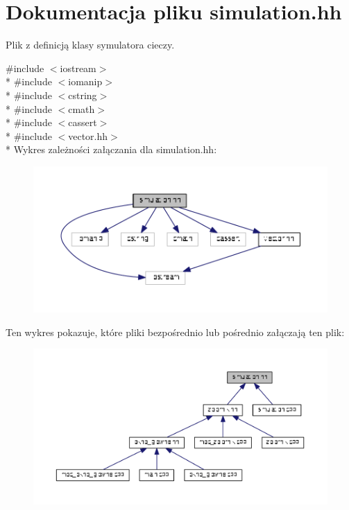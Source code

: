 \hypertarget{simulation_8hh}{}\section{Dokumentacja pliku simulation.\+hh}
\label{simulation_8hh}


Plik z definicją klasy symulatora cieczy.  


{\ttfamily \#include $<$iostream$>$}\\*
{\ttfamily \#include $<$iomanip$>$}\\*
{\ttfamily \#include $<$cstring$>$}\\*
{\ttfamily \#include $<$cmath$>$}\\*
{\ttfamily \#include $<$cassert$>$}\\*
{\ttfamily \#include $<$vector.\+hh$>$}\\*
Wykres zależności załączania dla simulation.\+hh\+:\nopagebreak
\begin{figure}[H]
\begin{center}
\leavevmode
\includegraphics[width=350pt]{simulation_8hh__incl}
\end{center}
\end{figure}
Ten wykres pokazuje, które pliki bezpośrednio lub pośrednio załączają ten plik\+:\nopagebreak
\begin{figure}[H]
\begin{center}
\leavevmode
\includegraphics[width=350pt]{simulation_8hh__dep__incl}
\end{center}
\end{figure}
